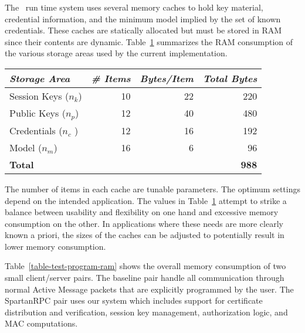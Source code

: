 The \Sprocket\ run time system uses several memory caches to hold key
material, credential information, and the minimum model implied by the
set of known credentials. These caches are statically allocated but must
be stored in RAM since their contents are dynamic.
Table~\ref{table-ram-consumed} summarizes the RAM consumption of the
various storage areas used by the current implementation.

\begin{table}[!t]
  \newcommand\T{\rule{0pt}{2.1ex}}
  \centering
  {
  \begin{tabular}{|l|r|r|r|} \hline
    \textit{Storage Area} \T & \textit{\# Items} & \textit{Bytes/Item} & \textit{Total Bytes} \\
    \hline \hline

    Session Keys ($n_k$) \T & 10 & 22 & 220 \\ \hline 
    Public Keys ($n_p$)  \T & 12 & 40 & 480 \\ \hline
    Credentials ($n_c$ ) \T & 12 & 16 & 192 \\ \hline
    Model ($n_m$)        \T & 16 &  6 &  96 \\ \hline \hline
    \textbf{Total} \T & \multicolumn{3}{r|}{ \textbf{988} } \\ \hline
  \end{tabular}
  }
  \label{table-ram-consumed}
\end{table}

The number of items in each cache are tunable parameters. The optimum
settings depend on the intended application. The values in
Table~\ref{table-ram-consumed} attempt to strike a balance between
usability and flexibility on one hand and excessive memory consumption
on the other. In applications where these needs are more clearly known a
priori, the sizes of the caches can be adjusted to potentially result in
lower memory consumption.

Table~\ref{table-test-program-ram} shows the overall memory consumption
of two small client/server pairs. The baseline pair handle all
communication through normal Active Message packets that are explicitly
programmed by the user. The SpartanRPC pair uses our system which
includes support for certificate distribution and verification, session
key management, authorization logic, and MAC computations.

